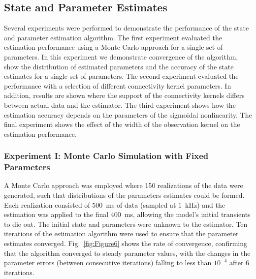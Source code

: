 \documentclass[5p,authoryear]{elsarticle}
\begin{document}
\subsection{State and Parameter Estimates} 
\label{sec:state_and_param_results}
Several experiments were performed to demonstrate the performance of the state and parameter estimation algorithm. The first experiment evaluated the estimation performance using a Monte Carlo approach for a single set of parameters. In this experiment we demonstrate convergence of the algorithm, show the distribution of estimated parameters and the accuracy of the state estimates for a single set of parameters. The second experiment evaluated the performance with a selection of different connectivity kernel parameters. In addition, results are shown where the support of the connectivity kernels differs between actual data and the estimator. The third experiment shows how the estimation accuracy depends on the parameters of the sigmoidal nonlinearity. The final experiment shows the effect of the width of the observation kernel on the estimation performance.

\subsubsection{Experiment I: Monte Carlo Simulation with Fixed Parameters}
A Monte Carlo approach was employed where 150 realizations of the data were generated, such that distributions of the parameters estimates could be formed. Each realization consisted of 500~ms of data (sampled at $1$~kHz) and the estimation was applied to the final 400~ms, allowing the model's initial transients to die out. The initial state and parameters were unknown to the estimator. Ten iterations of the estimation algorithm were used to ensure that the parameter estimates converged. Fig.~\ref{fig:Figure6} shows the rate of convergence, confirming that the algorithm converged to steady parameter values, with the changes in the parameter errors (between consecutive iterations) falling to less than $10^{-4}$ after 6 iterations.
\end{document}

